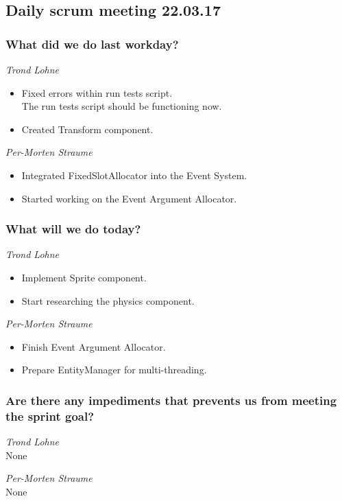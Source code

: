 \documentclass{article}
\begin{document}
\begin{center}
\subsection*{Daily scrum meeting 22.03.17}
\end{center}
\bigskip


\subsubsection*{What did we do last workday?}

\noindent\textit{Trond Lohne}
\begin{itemize}
	\item 
	Fixed errors within run tests script.\\
    The run tests script should be functioning now.
	
	\item 
	Created Transform component.
\end{itemize}

\medskip

\noindent\textit{Per-Morten Straume}
\begin{itemize}
	\item 
    Integrated FixedSlotAllocator into the Event System.
	
	\item 
	Started working on the Event Argument Allocator.
\end{itemize}


\subsubsection*{What will we do today?}

\noindent\textit{Trond Lohne}
\begin{itemize}
	\item 
	Implement Sprite component.
	
	\item 
	Start researching the physics component.
\end{itemize}

\medskip

\noindent\textit{Per-Morten Straume}
\begin{itemize}
	\item 
	Finish Event Argument Allocator.
	
	\item 
	Prepare EntityManager for multi-threading.
\end{itemize}


\subsubsection*{Are there any impediments that prevents us from meeting the sprint goal?}

\noindent\textit{Trond Lohne}\\
None

\medskip

\noindent\textit{Per-Morten Straume}\\
None
\end{document}
